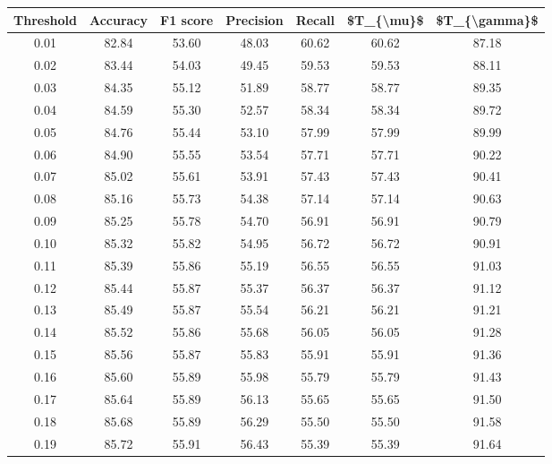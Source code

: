 \begin{tabular}{|c|c|c|c|c|c|c|}
\hline
 Threshold &  Accuracy &  F1 score &  Precision &  Recall &  \$T\_\{\textbackslash mu\}\$ &  \$T\_\{\textbackslash gamma\}\$ \\
\hline
      0.01 &     82.84 &     53.60 &      48.03 &   60.62 &      60.62 &         87.18 \\
      0.02 &     83.44 &     54.03 &      49.45 &   59.53 &      59.53 &         88.11 \\
      0.03 &     84.35 &     55.12 &      51.89 &   58.77 &      58.77 &         89.35 \\
      0.04 &     84.59 &     55.30 &      52.57 &   58.34 &      58.34 &         89.72 \\
      0.05 &     84.76 &     55.44 &      53.10 &   57.99 &      57.99 &         89.99 \\
      0.06 &     84.90 &     55.55 &      53.54 &   57.71 &      57.71 &         90.22 \\
      0.07 &     85.02 &     55.61 &      53.91 &   57.43 &      57.43 &         90.41 \\
      0.08 &     85.16 &     55.73 &      54.38 &   57.14 &      57.14 &         90.63 \\
      0.09 &     85.25 &     55.78 &      54.70 &   56.91 &      56.91 &         90.79 \\
      0.10 &     85.32 &     55.82 &      54.95 &   56.72 &      56.72 &         90.91 \\
      0.11 &     85.39 &     55.86 &      55.19 &   56.55 &      56.55 &         91.03 \\
      0.12 &     85.44 &     55.87 &      55.37 &   56.37 &      56.37 &         91.12 \\
      0.13 &     85.49 &     55.87 &      55.54 &   56.21 &      56.21 &         91.21 \\
      0.14 &     85.52 &     55.86 &      55.68 &   56.05 &      56.05 &         91.28 \\
      0.15 &     85.56 &     55.87 &      55.83 &   55.91 &      55.91 &         91.36 \\
      0.16 &     85.60 &     55.89 &      55.98 &   55.79 &      55.79 &         91.43 \\
      0.17 &     85.64 &     55.89 &      56.13 &   55.65 &      55.65 &         91.50 \\
      0.18 &     85.68 &     55.89 &      56.29 &   55.50 &      55.50 &         91.58 \\
      0.19 &     85.72 &     55.91 &      56.43 &   55.39 &      55.39 &         91.64 \\

\end{tabular}
